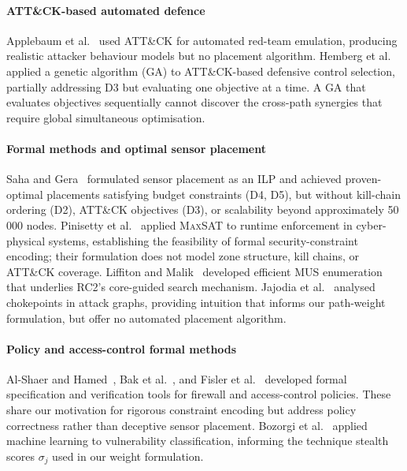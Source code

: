 \documentclass[journal]{IEEEtran}
\newcommand{\MAXSAT}{\textsc{MaxSAT}}
\begin{document}
\paragraph{ATT\&CK-based automated defence}
Applebaum et al.~\cite{applebaum2016} used ATT\&CK for automated
red-team emulation, producing realistic attacker behaviour models but
no placement algorithm. Hemberg et al.~\cite{hemberg2018} applied a
genetic algorithm (GA) to ATT\&CK-based defensive control selection,
partially addressing D3 but evaluating one objective at a time. A
GA that evaluates objectives sequentially cannot discover the
cross-path synergies that require global simultaneous optimisation.

\paragraph{Formal methods and optimal sensor placement}
Saha and Gera~\cite{saha2015} formulated sensor placement as an ILP
and achieved proven-optimal placements satisfying budget constraints
(D4, D5), but without kill-chain ordering (D2), ATT\&CK objectives
(D3), or scalability beyond approximately 50\,000 nodes.
Pinisetty et al.~\cite{pinisetty2017} applied \MAXSAT{} to runtime
enforcement in cyber-physical systems, establishing the feasibility
of formal security-constraint encoding; their formulation does not
model zone structure, kill chains, or ATT\&CK coverage.
Liffiton and Malik~\cite{liffiton2016} developed efficient MUS
enumeration that underlies RC2's core-guided search mechanism.
Jajodia et al.~\cite{jajodia2005} analysed chokepoints in attack
graphs, providing intuition that informs our path-weight formulation,
but offer no automated placement algorithm.

\paragraph{Policy and access-control formal methods}
Al-Shaer and Hamed~\cite{alshaer2004}, Bak et al.~\cite{bak2009},
and Fisler et al.~\cite{fisler2005} developed formal specification
and verification tools for firewall and access-control policies. These
share our motivation for rigorous constraint encoding but address
policy correctness rather than deceptive sensor placement.
Bozorgi et al.~\cite{bozorgi2010} applied machine learning to
vulnerability classification, informing the technique stealth scores
$\sigma_j$ used in our weight formulation.
\end{document}
